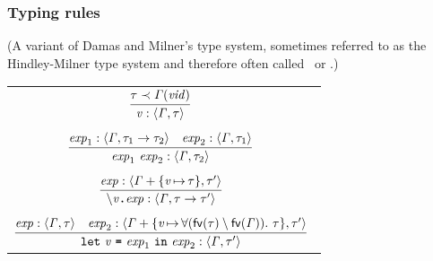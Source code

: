 \documentclass[12pt,red]{beamer}
\begin{document}
\begin{frame}
  \frametitle{Typing rules}

  (A variant of Damas and Milner's type system, sometimes referred to
  as the Hindley-Milner type system and therefore often called \DM\ or
  \HM.)

  \begin{center}
    \begin{tabular}{c}

      $\infer[]
      {\MEMtyping{\METAvar}{\METAityenv}{\METAity}}
      {\MEMinstance{\METAity}{\MEMafunc{\METAityenv}{\METAvid}}}$

      \\
      \\

      $\infer[]
      {\MEMtyping{\CONSappexp{\METAexp_1}{\METAexp_2}}{\METAityenv}{\METAity_2}}
      {
        \MEMtyping{\METAexp_1}{\METAityenv}{\CONSarrowty{\METAity_1}{\METAity_2}}
        &
        \MEMtyping{\METAexp_2}{\METAityenv}{\METAity_1}
      }$

      \\
      \\

      $\infer[]
      {\MEMtyping{\CONSlamexp{\METAvar}{\METAexp}}{\METAityenv}{\CONSarrowty{\METAity}{\METAity'}}}
      {
        \MEMtyping{\METAexp}{\MEMplusenv{\METAityenv}{\{\asgn{\METAvar}{\METAity}\}}}{\METAity'}
      }$

      \\
      \\

      $\infer[]
      {\MEMtyping{\CONSsplet{\METAvar}{\METAexp_1}{\METAexp_2}}{\METAityenv}{\METAity'}}
      {
        \MEMtyping{\METAexp}{\METAityenv}{\METAity}
        &
        \MEMtyping{\METAexp_2}{\MEMplusenv{\METAityenv}{\{\asgn{\METAvar}{\CONSityschemeb{(\MEMfreetyvars{\METAity}\setminus\MEMfreetyvars{\METAityenv})}{\METAity}}\}}}{\METAity'}
      }$
    \end{tabular}
  \end{center}
\end{frame}
\end{document}
